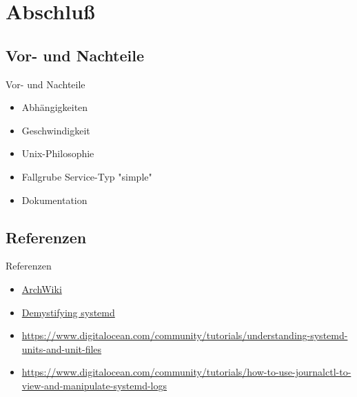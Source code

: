 \section{Abschluß}
\subsection{Vor- und Nachteile}

\begin{frame}{Vor- und Nachteile}
\begin{itemize}
\item[\goodsmile] Abhängigkeiten
\item[\goodsmile] Geschwindigkeit
\item[\neutralsmile] Unix-Philosophie	
\item[\sadsmile] Fallgrube Service-Typ "simple"
\item[\sadsmile] Dokumentation
\end{itemize}
\end{frame}

\subsection{Referenzen}

\begin{frame}{Referenzen}
\begin{itemize}	
	\item \href{https://wiki.archlinux.org/index.php/systemd}{ArchWiki}

	\item \href{https://www.redhat.com/files/summit/session-assets/2017/S103870-Demystifying-systemd.pdf}{Demystifying systemd}
	\item \href{https://www.digitalocean.com/community/tutorials/understanding-systemd-units-and-unit-files}{https://www.digitalocean.com/community/tutorials/understanding-systemd-units-and-unit-files}

	\item \href{https://www.digitalocean.com/community/tutorials/how-to-use-journalctl-to-view-and-manipulate-systemd-logs}{https://www.digitalocean.com/community/tutorials/how-to-use-journalctl-to-view-and-manipulate-systemd-logs}
\end{itemize}
\end{frame}



